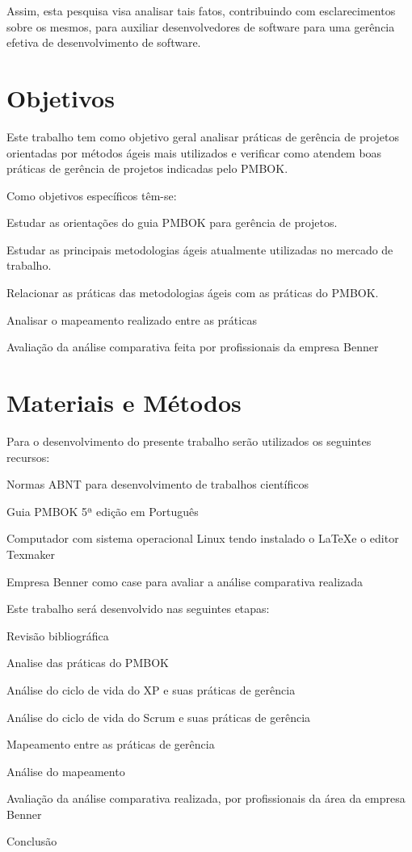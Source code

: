 \documentclass[
    12pt,               %
    openright,          %
    twoside,            %
    a4paper,            %
    chapter=TITLE,     %
    english,            %
    spanish,            %
    portuguese              %
    ]{abntex2}
\begin{document}
Assim, esta pesquisa visa analisar tais fatos, contribuindo com esclarecimentos sobre os mesmos, para auxiliar desenvolvedores de software para uma gerência efetiva de desenvolvimento de software.

\chapter{Objetivos}

Este trabalho tem como objetivo geral analisar práticas de gerência de projetos orientadas por métodos ágeis mais utilizados e verificar como atendem boas práticas de gerência de projetos indicadas pelo PMBOK.

Como objetivos específicos têm-se:
\begin{alineas}
	\item Estudar as orientações do guia PMBOK para gerência de projetos.
	\item Estudar as principais metodologias ágeis atualmente utilizadas no mercado de trabalho.
	\item Relacionar as práticas das metodologias ágeis com as práticas do PMBOK.
	\item Analisar o mapeamento realizado entre as práticas
	\item Avaliação da análise comparativa feita por profissionais da empresa Benner
\end{alineas}

\chapter{Materiais e Métodos}

Para o desenvolvimento do presente trabalho serão utilizados os seguintes recursos:
\begin{alineas}
	\item Normas ABNT para desenvolvimento de trabalhos científicos
	\item Guia PMBOK 5ª edição em Português
	\item Computador com sistema operacional Linux tendo instalado o \LaTeX e o editor Texmaker
	\item Empresa Benner como case para avaliar a análise comparativa  realizada
\end{alineas}

Este trabalho será desenvolvido nas seguintes etapas:
\begin{alineas}	
	\item Revisão bibliográfica
	\item Analise das práticas do PMBOK
	\item Análise do ciclo de vida do XP e suas práticas de gerência
	\item Análise do ciclo de vida do Scrum e suas práticas de gerência
	\item Mapeamento entre as práticas de gerência
	\item Análise do mapeamento
	\item Avaliação da análise comparativa realizada, por profissionais da área da empresa Benner
	\item Conclusão
\end{alineas}
	
\end{document}
